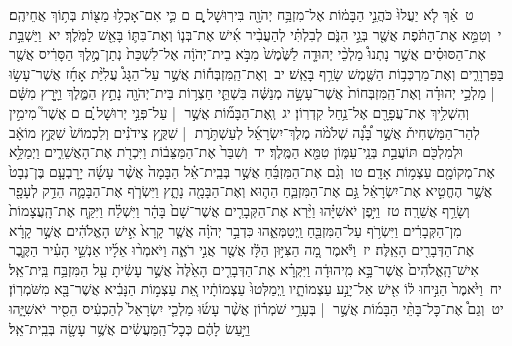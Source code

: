 \documentclass[18pt]{article}
\newcommand{\kri}[1]{\Afootnote{#1}}	%
\begin{document}
 {\loc ט~}אַ֗ךְ לֹ֤א יַעֲלוּ֙ כֹּהֲנֵ֣י הַבָּמ֔וֹת אֶל־מִזְבַּ֥ח יְהֹוָ֖ה בִּירֽוּשָׁל ָ֑͏ְם ם כִּ֛י אִם־אָכְל֥וּ מַצּ֖וֹת בְּת֥וֹךְ אֲחֵיהֶֽם׃ \startlock
 {\loc י~}וְטִמֵּ֣א אֶת־הַתֹּ֔פֶת אֲשֶׁ֖ר בְּגֵ֣י  \edtext{(בני)}{\kri{קרי: בֶן־}} הִנֹּ֑ם לְבִלְתִּ֗י לְהַעֲבִ֨יר אִ֜ישׁ אֶת־בְּנ֧וֹ וְאֶת־בִּתּ֛וֹ בָּאֵ֖שׁ לַמֹּֽלֶךְ׃ \startlock
 {\loc יא~}וַיַּשְׁבֵּ֣ת אֶת־הַסּוּסִ֗ים אֲשֶׁ֣ר נָתְנוּ֩ מַלְכֵ֨י יְהוּדָ֤ה לַשֶּׁ֙מֶשׁ֙ מִבֹּ֣א בֵית־יְהֹוָ֔ה אֶל־לִשְׁכַּת֙ נְתַן־מֶ֣לֶךְ הַסָּרִ֔יס אֲשֶׁ֖ר בַּפַּרְוָרִ֑ים וְאֶת־מַרְכְּב֥וֹת הַשֶּׁ֖מֶשׁ שָׂרַ֥ף בָּאֵֽשׁ׃ \startlock
 {\loc יב~}וְאֶת־הַֽמִּזְבְּח֡וֹת אֲשֶׁ֣ר עַל־הַגָּג֩ עֲלִיַּ֨ת אָחָ֜ז אֲשֶׁר־עָשׂ֣וּ  |  מַלְכֵ֣י יְהוּדָ֗ה וְאֶת־הַֽמִּזְבְּחוֹת֙ אֲשֶׁר־עָשָׂ֣ה מְנַשֶּׁ֔ה בִּשְׁתֵּ֛י חַצְר֥וֹת בֵּית־יְהֹוָ֖ה נָתַ֣ץ הַמֶּ֑לֶךְ וַיָּ֣רׇץ מִשָּׁ֔ם וְהִשְׁלִ֥יךְ אֶת־עֲפָרָ֖ם אֶל־נַ֥חַל קִדְרֽוֹן׃ \startlock
 {\loc יג~}וְֽאֶת־הַבָּמ֞וֹת אֲשֶׁ֣ר  |  עַל־פְּנֵ֣י יְרוּשָׁל ַ֗͏ְם ם אֲשֶׁר֮ מִימִ֣ין לְהַר־הַמַּשְׁחִית֒ אֲשֶׁ֣ר בָּ֠נָ֠ה שְׁלֹמֹ֨ה מֶלֶךְ־יִשְׂרָאֵ֜ל לְעַשְׁתֹּ֣רֶת  |  שִׁקֻּ֣ץ צִידֹנִ֗ים וְלִכְמוֹשׁ֙ שִׁקֻּ֣ץ מוֹאָ֔ב וּלְמִלְכֹּ֖ם תּוֹעֲבַ֣ת בְּנֵֽי־עַמּ֑וֹן טִמֵּ֖א הַמֶּֽלֶךְ׃ \startlock
 {\loc יד~}וְשִׁבַּר֙ אֶת־הַמַּצֵּב֔וֹת וַיִּכְרֹ֖ת אֶת־הָאֲשֵׁרִ֑ים וַיְמַלֵּ֥א אֶת־מְקוֹמָ֖ם עַצְמ֥וֹת אָדָֽם׃ \startlock
 {\loc טו~}וְגַ֨ם אֶת־הַמִּזְבֵּ֜חַ אֲשֶׁ֣ר בְּבֵֽית־אֵ֗ל הַבָּמָה֙ אֲשֶׁ֨ר עָשָׂ֜ה יָרׇבְעָ֤ם בֶּן־נְבָט֙ אֲשֶׁ֣ר הֶחֱטִ֣יא אֶת־יִשְׂרָאֵ֔ל גַּ֣ם אֶת־הַמִּזְבֵּ֧חַ הַה֛וּא וְאֶת־הַבָּמָ֖ה נָתָ֑ץ וַיִּשְׂרֹ֧ף אֶת־הַבָּמָ֛ה הֵדַ֥ק לְעָפָ֖ר וְשָׂרַ֥ף אֲשֵׁרָֽה׃ \startlock
 {\loc טז~}וַיִּ֣פֶן יֹאשִׁיָּ֗הוּ וַיַּ֨רְא אֶת־הַקְּבָרִ֤ים אֲשֶׁר־שָׁם֙ בָּהָ֔ר וַיִּשְׁלַ֗ח וַיִּקַּ֤ח אֶת־הָֽעֲצָמוֹת֙ מִן־הַקְּבָרִ֔ים וַיִּשְׂרֹ֥ף עַל־הַמִּזְבֵּ֖חַ וַֽיְטַמְּאֵ֑הוּ כִּדְבַ֣ר יְהֹוָ֗ה אֲשֶׁ֤ר קָרָא֙ אִ֣ישׁ הָאֱלֹהִ֔ים אֲשֶׁ֣ר קָרָ֔א אֶת־הַדְּבָרִ֖ים הָאֵֽלֶּה׃ \startlock
 {\loc יז~}וַיֹּ֕אמֶר מָ֚ה הַצִּיּ֣וּן הַלָּ֔ז אֲשֶׁ֖ר אֲנִ֣י רֹאֶ֑ה וַיֹּאמְר֨וּ אֵלָ֜יו אַנְשֵׁ֣י הָעִ֗יר הַקֶּ֤בֶר אִישׁ־הָֽאֱלֹהִים֙ אֲשֶׁר־בָּ֣א מִֽיהוּדָ֔ה וַיִּקְרָ֗א אֶת־הַדְּבָרִ֤ים הָאֵ֙לֶּה֙ אֲשֶׁ֣ר עָשִׂ֔יתָ עַ֖ל הַמִּזְבַּ֥ח בֵּֽית־אֵֽל׃ \startlock
 {\loc יח~}וַיֹּ֙אמֶר֙ הַנִּ֣יחוּ ל֔וֹ אִ֖ישׁ אַל־יָנַ֣ע עַצְמוֹתָ֑יו וַֽיְמַלְּטוּ֙ עַצְמוֹתָ֔יו אֵ֚ת עַצְמ֣וֹת הַנָּבִ֔יא אֲשֶׁר־בָּ֖א מִשֹּׁמְרֽוֹן׃ \startlock
 {\loc יט~}וְגַם֩ אֶת־כׇּל־בָּתֵּ֨י הַבָּמ֜וֹת אֲשֶׁ֣ר  |  בְּעָרֵ֣י שֹׁמְר֗וֹן אֲשֶׁ֨ר עָשׂ֜וּ מַלְכֵ֤י יִשְׂרָאֵל֙ לְהַכְעִ֔יס הֵסִ֖יר יֹאשִׁיָּ֑הוּ וַיַּ֣עַשׂ לָהֶ֔ם כְּכׇל־הַֽמַּעֲשִׂ֔ים אֲשֶׁ֥ר עָשָׂ֖ה בְּבֵֽית־אֵֽל׃ \startlock
\end{document}
